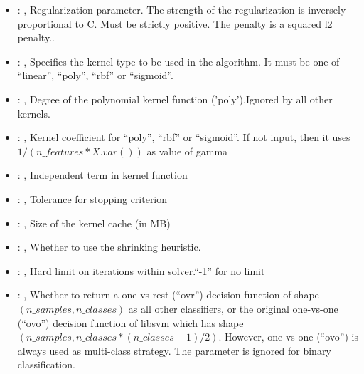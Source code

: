 \begin{itemize}
    \item {}: , 
      Regularization parameter. The strength of the regularization is inversely
      proportional to C.                                                            Must be strictly
      positive. The penalty is a squared l2 penalty..

    \item {}: , 
      Specifies the kernel type to be used in the algorithm. It must be one of
      ``linear'', ``poly'', ``rbf'' or ``sigmoid''.

    \item {}: , 
      Degree of the polynomial kernel function ('poly').Ignored by all other kernels.

    \item {}: , 
      Kernel coefficient for ``poly'', ``rbf'' or ``sigmoid''. If not input, then it uses
      $1 / (n\_features * X.var())$ as value of gamma

    \item {}: , 
      Independent term in kernel function

    \item {}: , 
      Tolerance for stopping criterion

    \item {}: , 
      Size of the kernel cache (in MB)

    \item {}: , 
      Whether to use the shrinking heuristic.

    \item {}: , 
      Hard limit on iterations within solver.``-1'' for no limit

    \item {}: , 
      Whether to return a one-vs-rest (``ovr'') decision function of shape $(n\_samples, n\_classes)$
      as                                                            all other classifiers, or the
      original one-vs-one (``ovo'') decision function of libsvm which has
      shape $(n\_samples, n\_classes * (n\_classes - 1) / 2)$. However, one-vs-one (``ovo'') is always
      used as                                                            multi-class strategy. The
      parameter is ignored for binary classification.


\end{itemize}
